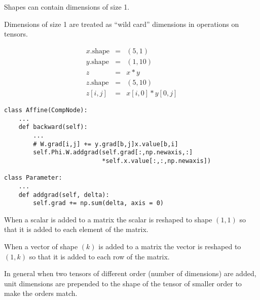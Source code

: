 {

Shapes can contain dimensions of size 1.

\vfill
Dimensions of size 1 are treated as ``wild card'' dimensions in operations on tensors.

\vfill
\begin{eqnarray*}
  x.\mathrm{shape} & = & (5,1) \\
  y.\mathrm{shape} & = & (1,10) \\
  z & = & x*y \\
  z.\mathrm{shape} & = & (5,10) \\
  z[i,j] & = & x[i,0] * y[0,j]
\end{eqnarray*}

\vfill
\eject
\vfill
\begin{verbatim}
class Affine(CompNode):
    ...
    def backward(self):
        ...
        # W.grad[i,j] += y.grad[b,j]x.value[b,i]
        self.Phi.W.addgrad(self.grad[:,np.newaxis,:]
                           *self.x.value[:,:,np.newaxis])

class Parameter:
    ...
    def addgrad(self, delta):
        self.grad += np.sum(delta, axis = 0)
\end{verbatim}


When a scalar is added to a matrix the scalar is reshaped to shape $(1,1)$ so that it is added to each element of the matrix.

\vfill
When a vector of shape $(k)$ is added to a matrix the vector is reshaped to $(1,k)$ so that it is added to each row of the matrix.

\vfill
In general when two tensors of different order (number of dimensions) are added, unit dimensions are prepended to the shape of the tensor of smaller order
to make the orders match.

}



